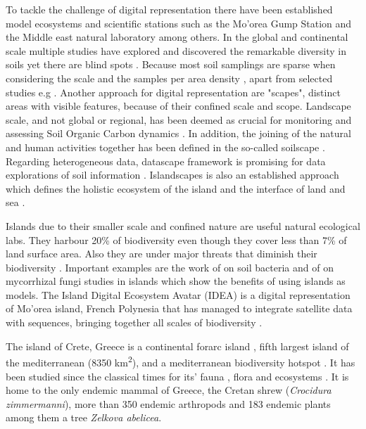 \documentclass[a4paper,12pt]{article}
\begin{document}
To tackle the challenge of digital representation there have been established model ecosystems
and scientific stations such
as the Mo'orea Gump Station \parencite{Davies2016} and the Middle east natural laboratory \parencite{blanco-sacristan2024the-middle} among others.
In the global and continental scale multiple studies have explored and
discovered the remarkable diversity in soils yet there are blind spots \parencite{Guerra2020}.
Because most soil samplings are sparse when considering the scale and the samples per area density \parencite{Dini-Andreote2021},
apart from selected studies e.g \textcite{Karimi2020}.
Another approach for digital representation are "scapes", distinct areas with visible features, 
because of their confined scale and scope.
Landscape scale, and not global or regional, has been deemed as crucial for monitoring and assessing 
Soil Organic Carbon dynamics \parencite{doetterl2025a-landscape-scale}.
In addition, the joining of the natural and human activities 
together has been defined in the so-called soilscape \parencite{LAGACHERIE2001105}.
Regarding heterogeneous data, datascape framework is promising for data explorations of soil information \parencite{rolland2024datascape:}. 
Islandscapes 
is also an established approach which defines the holistic ecosystem of the island
and the interface of land and sea \parencite{Vogiatzakis_land_2017}.

Islands due to their smaller scale and confined nature are useful natural ecological labs.
They harbour 20\% of biodiversity even though they cover less than 7\% of land surface area.
Also they are under major threats that diminish their biodiversity \parencite{fernandez-palacios2021scientists}.
Important examples are the work of \textcite{Li2020} on soil bacteria and of \textcite{Delavaux2021} on mycorrhizal fungi studies
in islands which show the benefits of using islands as models.
The Island Digital Ecosystem Avatar (IDEA) is a digital representation of Mo'orea island,
French Polynesia that has managed to integrate satellite data with sequences,
bringing together all scales of biodiversity \parencite{Davies2016,davies2023island}.

The island of Crete, Greece is a continental forarc island \parencite{ali2016},
fifth largest island of the mediterranean (8350 km\textsuperscript{2}),
and a mediterranean biodiversity hotspot \parencite{myers2000biodiversity}.
It has been studied since the classical times for its'
fauna \parencite{Sidiropoulos_Polymeni_Legakis_2017,Anastasiou2018Tenebrionid},
flora \parencite{Krimbas_2005} and ecosystems \parencite{Grove1993}.
It is home to the only endemic mammal of Greece, the Cretan shrew (\textit{Crocidura zimmermanni}),
more than 350 endemic arthropods \parencite{bolanakis2024} and 183 endemic plants \parencite{Kougioumoutzis2020}
among them a tree \textit{Zelkova abelicea}.
\end{document}
